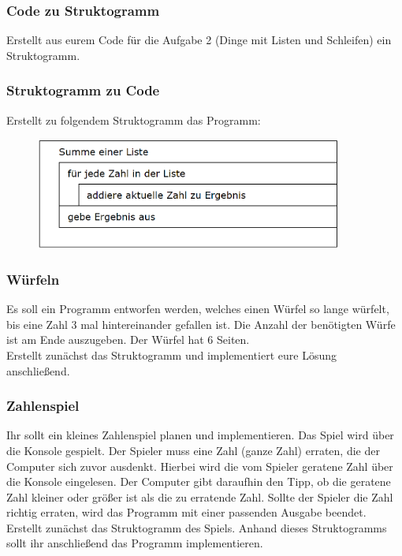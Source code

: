 \subsubsection{Code zu Struktogramm}
Erstellt aus eurem Code für die Aufgabe 2 (Dinge mit Listen und Schleifen) ein Struktogramm.

\subsubsection{Struktogramm zu Code}
Erstellt zu folgendem Struktogramm das Programm:
\begin{figure}[H]
\begin{center}
	\includegraphics[width=0.9\textwidth]{imgs/for_loop.png} %
\end{center}
\end{figure}

\subsubsection{Würfeln}
Es soll ein Programm entworfen werden, welches einen Würfel so lange würfelt, bis eine Zahl 3 mal hintereinander gefallen ist. Die Anzahl der benötigten Würfe ist am Ende auszugeben. Der Würfel hat 6 Seiten. \\
Erstellt zunächst das Struktogramm und implementiert eure Lösung anschließend.


\subsubsection{Zahlenspiel}
Ihr sollt ein kleines Zahlenspiel planen und implementieren. Das Spiel wird über die Konsole gespielt. Der Spieler muss eine Zahl (ganze Zahl) erraten, die der Computer sich zuvor ausdenkt. Hierbei wird die vom Spieler geratene Zahl über die Konsole eingelesen. Der Computer gibt daraufhin den Tipp, ob die geratene Zahl kleiner oder größer ist als die zu erratende Zahl. Sollte der Spieler die Zahl richtig erraten, wird das Programm mit einer passenden Ausgabe beendet.\\
Erstellt zunächst das Struktogramm des Spiels. Anhand dieses Struktogramms sollt ihr anschließend das Programm implementieren.